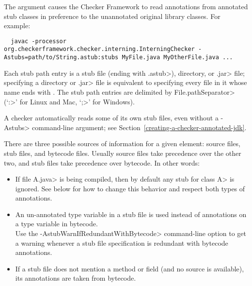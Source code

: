 
The  argument causes the Checker Framework to read
annotations from annotated stub classes in preference to the unannotated
original library classes.  For example:

\begin{myxsmall}
\begin{Verbatim}
  javac -processor org.checkerframework.checker.interning.InterningChecker -Astubs=path/to/String.astub:stubs MyFile.java MyOtherFile.java ...
\end{Verbatim}
\end{myxsmall}

Each stub path entry is a stub file (ending with \<.astub>), directory, or
\<.jar> file; specifying a directory or \<.jar> file is
equivalent to specifying every file in it whose name ends with
.  The stub path entries are delimited by
\<File.pathSeparator> (`\<:>' for Linux and Mac, `\<;>' for Windows).

A checker automatically reads some of its own stub files, even without a
\<-Astubs> command-line argument; see
Section~\ref{creating-a-checker-annotated-jdk}.



There are three possible sources of information for a given
element: source files, stub files, and bytecode files.
Usually source files take precedence over the other two,
and stub files take precedence over bytecode.
In other words:
\begin{itemize}
\item
  If file \<A.java> is being compiled, then by default any stub for class
  \<A> is ignored.  See below for how to change this behavior and respect
  both types of annotations.
\item
  An un-annotated type variable in a stub file is used instead of
  annotations on a type variable in bytecode.
  \\
  Use the \<-AstubWarnIfRedundantWithBytecode> command-line option to get a
  warning whenever a stub file specification is redundant with bytecode
  annotations.
\item
  If a stub file does not mention a method or field (and no source is
  available), its annotations are taken from bytecode.
\end{itemize}

